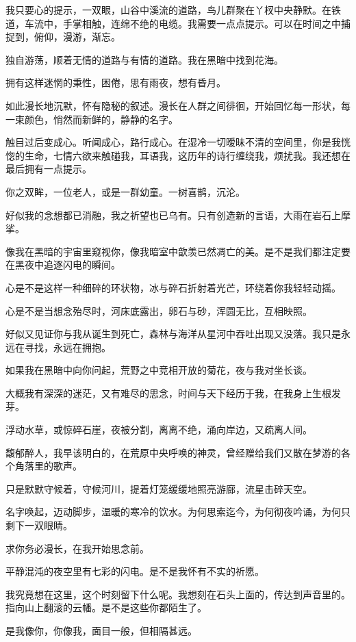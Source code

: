 \documentclass[UTF8]{article}
\begin{document}
\par 我只要心的提示，一双眼，山谷中溪流的道路，鸟儿群聚在丫杈中央静默。在铁道，车流中，手掌相触，连绵不绝的电缆。我需要一点点提示。可以在时间之中捕捉到，俯仰，漫游，渐忘。
\par 独自游荡，顺着无情的道路与有情的道路。我在黑暗中找到花海。
\par 拥有这样迷惘的秉性，困倦，思有雨夜，想有昏月。
\par 如此漫长地沉默，怀有隐秘的叙述。漫长在人群之间徘徊，开始回忆每一形状，每一束颜色，悄然而新鲜的，静静的名字。
\par 触目过后变成心。听闻成心，路行成心。在湿冷一切暧昧不清的空间里，你是我恍惚的生命，七情六欲来触碰我，耳语我，这历年的诗行缠绕我，烦扰我。我还想在最后拥有一点提示。
\par 你之双眸，一位老人，或是一群幼童。一树喜鹊，沉沦。
\par 好似我的念想都已消融，我之祈望也已乌有。只有创造新的言语，大雨在岩石上摩挲。
\par 像我在黑暗的宇宙里窥视你，像我暗室中歆羡已然凋亡的美。是不是我们都注定要在黑夜中追逐闪电的瞬间。
\par 心是不是这样一种细碎的环状物，冰与碎石折射着光芒，环绕着你我轻轻动摇。
\par 心是不是当想念殆尽时，河床底露出，卵石与砂，浑圆无比，互相映照。
\par 好似又见证你与我从诞生到死亡，森林与海洋从星河中吞吐出现又没落。我只是永远在寻找，永远在拥抱。
\par 如果我在黑暗中向你问起，荒野之中竞相开放的菊花，夜与我对坐长谈。
\par 大概我有深深的迷茫，又有难尽的思念，时间与天下经历于我，在我身上生根发芽。
\par 浮动水草，或惊碎石崖，夜被分割，离离不绝，涌向岸边，又疏离人间。
\par 馥郁醉人，我早该明白的，在荒原中央呼唤的神灵，曾经赠给我们又散在梦游的各个角落里的歌声。
\par 只是默默守候着，守候河川，提着灯笼缓缓地照亮游廊，流星击碎天空。
\par 名字唤起，迈动脚步，温暖的寒冷的饮水。为何思索迄今，为何彻夜吟诵，为何只剩下一双眼睛。
\par 求你务必漫长，在我开始思念前。
\\[0.6cm]
\par 平静混沌的夜空里有七彩的闪电。是不是我怀有不实的祈愿。
\par 我究竟想在这里，这个时刻留下什么呢。我想刻在石头上面的，传达到声音里的。指向山上翻滚的云幡。是不是这些你都陌生了。
\par 是我像你，你像我，面目一般，但相隔甚远。
\end{document}
